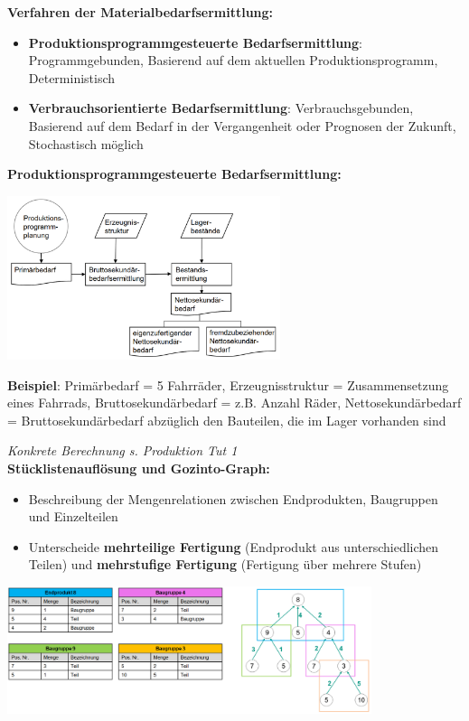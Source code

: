 \textbf{Verfahren der Materialbedarfsermittlung:}
\begin{itemize}
	\item \textbf{Produktionsprogrammgesteuerte Bedarfsermittlung}: Programmgebunden, Basierend auf dem aktuellen Produktionsprogramm, Deterministisch
	\item \textbf{Verbrauchsorientierte Bedarfsermittlung}: Verbrauchsgebunden, Basierend auf dem Bedarf in der Vergangenheit oder Prognosen der Zukunft, Stochastisch möglich
\end{itemize}
\bigskip
\textbf{Produktionsprogrammgesteuerte Bedarfsermittlung:}
\begin{center}
	\includegraphics[width=0.6\textwidth]{images/pp-bedarfsermittlung.png}
\end{center}
\textbf{Beispiel}: Primärbedarf = 5 Fahrräder, Erzeugnisstruktur = Zusammensetzung eines Fahrrads, Bruttosekundärbedarf = z.B. Anzahl Räder, Nettosekundärbedarf = Bruttosekundärbedarf abzüglich den Bauteilen, die im Lager vorhanden sind

\textit{Konkrete Berechnung s. Produktion Tut 1}\\

\textbf{Stücklistenauflösung und Gozinto-Graph:}
\begin{itemize}
	\item Beschreibung der Mengenrelationen zwischen Endprodukten, Baugruppen und Einzelteilen
	\item Unterscheide \textbf{mehrteilige Fertigung} (Endprodukt aus unterschiedlichen Teilen) und \textbf{mehrstufige Fertigung} (Fertigung über mehrere Stufen)
\end{itemize}
\begin{center}
	\includegraphics[width=0.8\textwidth]{images/gozinto.png}
\end{center}

